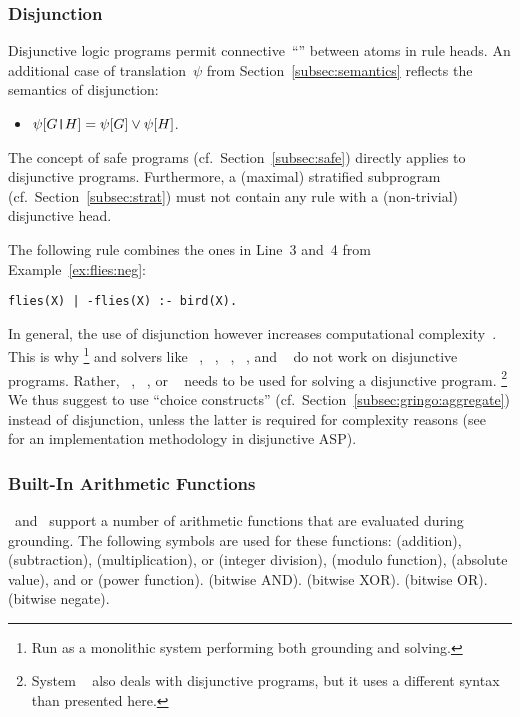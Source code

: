 \subsubsection{Disjunction}\label{subsec:gringo:disjunction}

Disjunctive logic programs permit connective~``\code{|}'' between atoms in rule heads.
An additional case of translation~$\psi$ from Section~\ref{subsec:semantics}
reflects the semantics of disjunction:
\begin{itemize}
\item $\psi[G\texttt{|}H]=\psi[G]\vee\psi[H]$.
\end{itemize}
%
The concept of safe programs (cf.\ Section~\ref{subsec:safe}) directly applies
to disjunctive programs.
Furthermore, a (maximal) stratified subprogram (cf.\ Section~\ref{subsec:strat})
must not contain any rule with a (non-trivial) disjunctive head.

The following rule combines the ones in Line~3 and~4 from Example~\ref{ex:flies:neg}:
\begin{lstlisting}[numbers=none]
flies(X) | -flies(X) :- bird(X).
\end{lstlisting}
In general, the use of disjunction however increases
computational complexity~\cite{eitgot95a}.
This is why \clingo%
\footnote{Run as a monolithic system performing both grounding and solving.}
and solvers like 
\assat~\cite{linzha04a},
\clasp~\cite{gekanesc07b},
\nomorepp~\cite{angelinesc05c},
\smodels~\cite{siniso02a}, and
\smodelscc~\cite{warsch04a}
do not work on disjunctive programs.
Rather,
\claspD~\cite{drgegrkakoossc08a},
\cmodels~\cite{gilima06a,lierler05a}, or
\gnt~\cite{janisesiyo06a}
needs to be used for solving a disjunctive program.%
\footnote{System \dlv~\cite{dlv03a} also deals with disjunctive programs,
  but it uses a different syntax than presented here.}
We thus suggest to use ``choice constructs'' (cf.\ Section~\ref{subsec:gringo:aggregate})
instead of disjunction, unless the latter is required for complexity reasons
(see~\cite{eitpol06a} for an implementation methodology in disjunctive ASP).


\subsubsection{Built-In Arithmetic Functions}\label{subsec:gringo:arith}

\gringo\ and \clingo\ support a number of arithmetic functions that
are evaluated during grounding.
The following symbols are used for these functions:
\code{+} (addition),
\code{-} (subtraction),
\code{*} (multiplication),
\code{/} or  (integer division),
 (modulo function),
 (absolute value), and
\code{**} or  (power function).
\code{\&} (bitwise AND).
\code{^} (bitwise XOR).
 (bitwise OR).
\code{\~} (bitwise negate).

